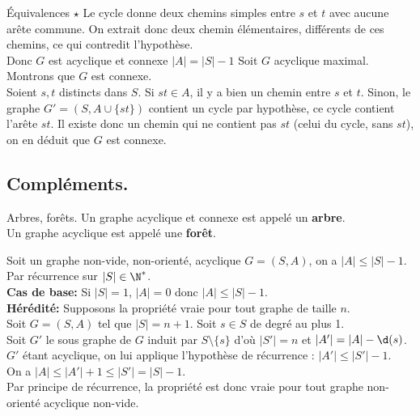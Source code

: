 \documentclass[french, 11pt]{article}
\begin{document}
\begin{prop}{Équivalences $\star$}{}
    Le cycle donne deux chemins simples entre $s$ et $t$ avec aucune arête commune. On extrait donc deux chemin élémentaires, différents de ces chemins, ce qui contredit l'hypothèse.\\
    Donc $G$ est acyclique et connexe $|A|=|S|-1$\n
     Soit $G$ acyclique maximal. Montrons que $G$ est connexe.\\
    Soient $s,t$ distincts dans $S$. Si $st\in A$, il y a bien un chemin entre $s$ et $t$. Sinon, le graphe $G'=(S,A\cup\{st\})$ contient un cycle par hypothèse, ce cycle contient l'arête $st$. Il existe donc un chemin qui ne contient pas $st$ (celui du cycle, sans $st$), on en déduit que $G$ est connexe.
\end{prop}

\vspace*{-0.7cm}

\subsection{Compléments.}

\begin{defi}{Arbres, forêts.}{}
    Un graphe acyclique et connexe est appelé un \textbf{arbre}.\\
    Un graphe acyclique est appelé une \textbf{forêt}. 
\end{defi}

\begin{prop}{}{}
    Soit un graphe non-vide, non-orienté, acyclique $G=(S,A)$, on a $|A|\leq|S|-1$.
    \tcblower
    Par récurrence sur $|S|\in\N^*$.\\
    \textbf{Cas de base:} Si $|S|=1$, $|A|=0$ donc $|A|\leq|S|-1$.\\
    \textbf{Hérédité:} Supposons la propriété vraie pour tout graphe de taille $n$.\\
    Soit $G=(S,A)$ tel que $|S|=n+1$. Soit $s\in S$ de degré au plus 1.\\
    Soit $G'$ le sous graphe de $G$ induit par $S\setminus\{s\}$ d'où $|S'| = n$ et $|A'|=|A|-\d(s)$.\\
    $G'$ étant acyclique, on lui applique l'hypothèse de récurrence : $|A'|\leq|S'|-1$.\\
    On a $|A|\leq|A'|+1\leq|S'|=|S|-1$.\\
    Par principe de récurrence, la propriété est donc vraie pour tout graphe non-orienté acyclique non-vide.
\end{prop}

\vspace*{-0.7cm}
\end{document}
